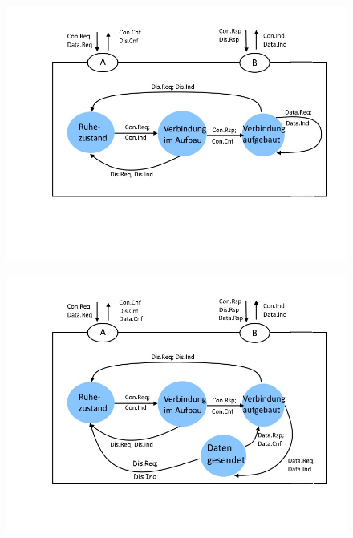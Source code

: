 \documentclass{../exercisesheet}
\begin{document}
\begin{exercise}{3.5}
	\begin{subexercise}
		\begin{figure}[h]
  			\centering
  			\includegraphics[scale=0.7]{1_5a.jpg}
		\end{figure}
	\end{subexercise}
	\newpage
	\begin{subexercise}
		\begin{figure}[h]
  			\centering
  			\includegraphics[scale=0.7]{1_5b.jpg}
		\end{figure}
	\end{subexercise}
\end{exercise}
\end{document}
